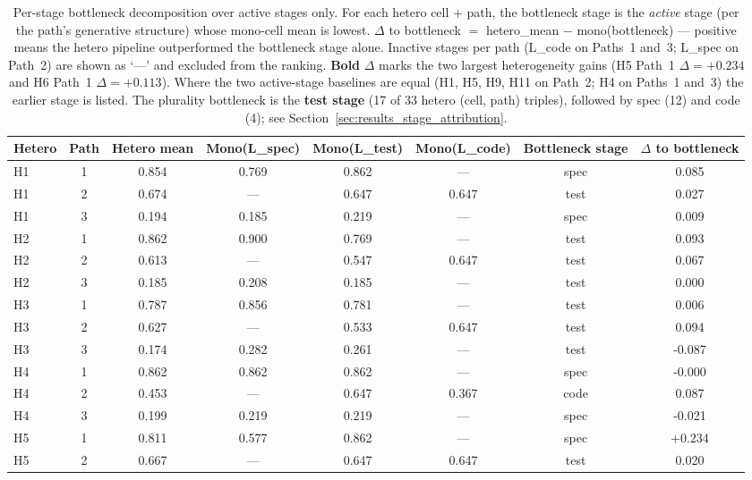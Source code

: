 \begin{table}[!htbp]
\centering
\caption{Per-stage bottleneck decomposition over active stages only. For each hetero cell + path, the bottleneck stage is the \emph{active} stage (per the path's generative structure) whose mono-cell mean is lowest. $\Delta$ to bottleneck $=$ hetero\_mean $-$ mono(bottleneck) --- positive means the hetero pipeline outperformed the bottleneck stage alone. Inactive stages per path (L\_code on Paths~1 and~3; L\_spec on Path~2) are shown as `---' and excluded from the ranking. \textbf{Bold} $\Delta$ marks the two largest heterogeneity gains (H5 Path~1 $\Delta = +0.234$ and H6 Path~1 $\Delta = +0.113$). Where the two active-stage baselines are equal (H1, H5, H9, H11 on Path~2; H4 on Paths~1 and~3) the earlier stage is listed. The plurality bottleneck is the \textbf{test stage} (17 of 33 hetero (cell, path) triples), followed by spec (12) and code (4); see Section~\ref{sec:results_stage_attribution}.}
\label{tab:per_stage_bottleneck}
\begin{tabular}{@{}lccccccc@{}}
\toprule
Hetero & Path & Hetero mean & Mono(L\_spec) & Mono(L\_test) & Mono(L\_code) & Bottleneck stage & $\Delta$ to bottleneck \\
\midrule
H1 & 1 & 0.854 & 0.769 & 0.862 & --- & spec & 0.085 \\
H1 & 2 & 0.674 & --- & 0.647 & 0.647 & test & 0.027 \\
H1 & 3 & 0.194 & 0.185 & 0.219 & --- & spec & 0.009 \\
H2 & 1 & 0.862 & 0.900 & 0.769 & --- & test & 0.093 \\
H2 & 2 & 0.613 & --- & 0.547 & 0.647 & test & 0.067 \\
H2 & 3 & 0.185 & 0.208 & 0.185 & --- & test & 0.000 \\
H3 & 1 & 0.787 & 0.856 & 0.781 & --- & test & 0.006 \\
H3 & 2 & 0.627 & --- & 0.533 & 0.647 & test & 0.094 \\
H3 & 3 & 0.174 & 0.282 & 0.261 & --- & test & -0.087 \\
H4 & 1 & 0.862 & 0.862 & 0.862 & --- & spec & -0.000 \\
H4 & 2 & 0.453 & --- & 0.647 & 0.367 & code & 0.087 \\
H4 & 3 & 0.199 & 0.219 & 0.219 & --- & spec & -0.021 \\
H5 & 1 & 0.811 & 0.577 & 0.862 & --- & spec & $\mathbf{+0.234}$ \\
H5 & 2 & 0.667 & --- & 0.647 & 0.647 & test & 0.020 \\

\end{tabular}
\end{table}
